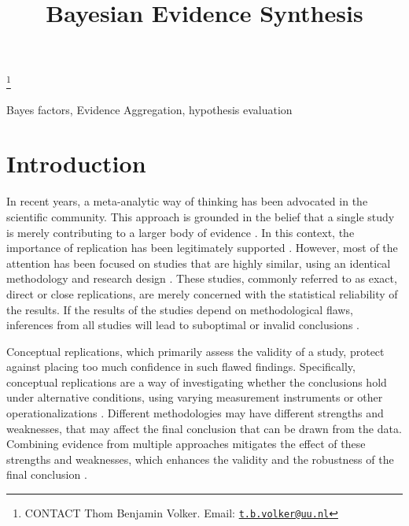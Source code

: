\documentclass[]{interact}
\theoremstyle{plain}%
\theoremstyle{definition}
\theoremstyle{remark}
\begin{document}

\title{Bayesian Evidence Synthesis}


\author{
}

\thanks{CONTACT Thom Benjamin
Volker. Email: \href{mailto:t.b.volker@uu.nl}{\nolinkurl{t.b.volker@uu.nl}}}

\maketitle


\begin{keywords}
Bayes factors, Evidence Aggregation, hypothesis evaluation
\end{keywords}

\hypertarget{introduction}{%
\section{Introduction}\label{introduction}}

In recent years, a meta-analytic way of thinking has been advocated in
the scientific community. This approach is grounded in the belief that a
single study is merely contributing to a larger body of evidence
\citep[e.g.,][]{asendorpf_recommendations_2016, cumming_new_2014, goodman_reproducibility_2016, schmidt_replication_2009}.
In this context, the importance of replication has been legitimately
supported
\citep[e.g.,][]{baker_reproducibility_2016, brandt_et_al_replication_2014, munafo_manifesto_2017}.
However, most of the attention has been focused on studies that are
highly similar, using an identical methodology and research design
\citep[e.g.,][]{camerer2016evaluating, camerer2018evaluating, klein_etal_replicability_2014, nosek_replicability_review_2021, open_science_collab_2015}.
These studies, commonly referred to as exact, direct or close
replications, are merely concerned with the statistical reliability of
the results. If the results of the studies depend on methodological
flaws, inferences from all studies will lead to suboptimal or invalid
conclusions \citep{lawlor_triangulation_2017, munafo_robust_2018}.

Conceptual replications, which primarily assess the validity of a study,
protect against placing too much confidence in such flawed findings.
Specifically, conceptual replications are a way of investigating whether
the conclusions hold under alternative conditions, using varying
measurement instruments or other operationalizations
\citep{nosek_scientific_2012}. Different methodologies may have
different strengths and weaknesses, that may affect the final conclusion
that can be drawn from the data. Combining evidence from multiple
approaches mitigates the effect of these strengths and weaknesses, which
enhances the validity and the robustness of the final conclusion
\citep{lawlor_triangulation_2017, lipton2003inference, mathison1988triangulate, munafo_robust_2018, nosek_scientific_2012}.
\end{document}
